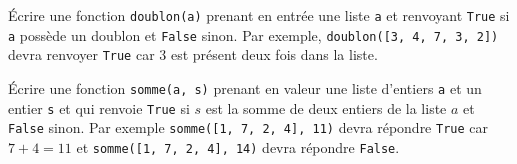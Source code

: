 \documentclass{magnolia}
\begin{document}
Écrire une fonction \verb!doublon(a)! prenant en entrée une liste \verb!a! et renvoyant \verb_True_
si \verb_a_ possède un doublon et \verb_False_ sinon. Par exemple, \verb_doublon([3, 4, 7, 3, 2])_
devra renvoyer \verb_True_ car 3 est présent deux fois dans la liste.

Écrire une fonction \verb!somme(a, s)! prenant en valeur une liste d'entiers \verb!a! et un entier \verb!s!
et qui renvoie \verb_True_ si $s$ est la somme de deux entiers de la liste $a$ et \verb!False! sinon.
Par exemple \verb!somme([1, 7, 2, 4], 11)! devra répondre \verb!True! car $7+4=11$ et
\verb!somme([1, 7, 2, 4], 14)! devra répondre \verb!False!.




\end{document}
